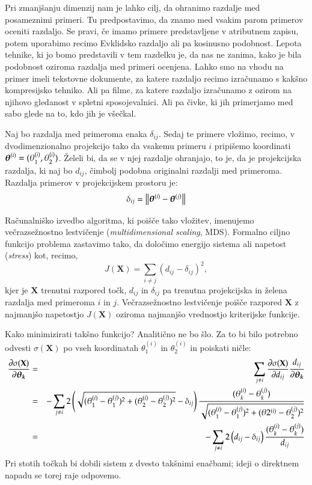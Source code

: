 Pri zmanjšanju dimenzij nam je lahko cilj, da ohranimo razdalje med posameznimi primeri. Tu predpostavimo, da znamo med vsakim parom primerov oceniti razdaljo. Se pravi, če imamo primere predstavljene v atributnem zapisu, potem uporabimo recimo Evklidsko razdaljo ali pa kosinusno podobnost. Lepota tehnike, ki jo bomo predstavili v tem razdelku je, da nas ne zanima, kako je bila podobnost oziroma razdalja med primeri ocenjena. Lahko smo na vhodu na primer imeli tekstovne dokumente, za katere razdaljo recimo izračunamo s kakšno kompresijsko tehniko. Ali pa filme, za katere razdaljo izračunamo z ozirom na njihovo gledanost v spletni sposojevalnici. Ali pa čivke, ki jih primerjamo med sabo glede na to, kdo jih je všečkal.

Naj bo razdalja med primeroma enaka $\delta_{ij}$. Sedaj te primere vložimo, recimo, v dvodimenzionalno projekcijo tako da vsakemu primeru $i$ pripišemo koordinati $\boldsymbol{\theta}^{(i)}=(\theta_1^{(i)},\theta_2^{(i)})$. Želeli bi, da se v njej razdalje ohranjajo, to je, da je projekcijska razdalja, ki naj bo $d_{ij}$, čimbolj podobna originalni razdalji med primeroma. Razdalja primerov v projekcijskem prostoru je:
$$\delta_{ij}=\left\lVert{\boldsymbol{\theta}}^{(i)}-\boldsymbol{\theta}^{(j)}\right\rVert$$

Računalniško izvedbo algoritma, ki poišče tako vložitev, imenujemo večrazsežnostno lestvičenje ({\em multidimensional scaling}, MDS). Formalno ciljno funkcijo problema zastavimo tako, da določimo energijo sistema ali napetost ({\em stress}) kot, recimo,
$$J(\mathbf{X}) = \sum_{i\ne j} (d_{ij} - \delta_{ij})^2,$$
kjer je $\mathbf{X}$ trenutni razpored točk, $d_{ij}$ in $\delta_{ij}$ pa trenutna projekcijska in želena razdalja med primeroma $i$ in $j$. Večrazsežnostno lestvičenje poišče razpored $\mathbf{X}$ z najmanjšo napetostjo $J(\mathbf{X})$ oziroma najmanjšo vrednostjo kriterijske funkcije.

Kako minimizirati takšno funkcijo? Analitično ne bo šlo. Za to bi bilo potrebno odvesti $\sigma(\mathbf{X})$ po vseh koordinatah $\theta_1^{(i)}$ in $\theta_2^{(i)}$ in poiskati ničle:
\begin{eqnarray}
  \frac{\partial\sigma({\mathbf{X}})}{\partial \boldsymbol{\theta_k}} & = &
  \sum_{j\ne i} \frac{\partial\sigma({\mathbf{X}})}{\partial d_{ij}}\frac{d_{ij}}{\partial \boldsymbol{\theta_k}} \nonumber \\
  & = & - \sum_{j\ne i} 2\left(\sqrt{(\theta_1^{(i)}-\theta_1^{(j)})^2+(\theta_2^{(i)}-\theta_2^{(j)})^2}-\delta_{ij}\right) \frac{(\theta_k^{(i)}-\theta_k^{(j)})}{\sqrt{(\theta_1^{(i)}-\theta_1^{(j)})^2+(\theta2^{(i)}-\theta_2^{(j)})^2}} \nonumber \\
& = & - \sum_{j\ne i} 2\left(d_{ij}-\delta_{ij}\right) \frac{(\theta_k^{(i)}-\theta_k^{(j)})}{d_{ij}} \label{eq:mds-grad}
\end{eqnarray}
Pri stotih točkah bi dobili sistem z dvesto takšnimi enačbami; ideji o direktnem napadu se torej raje odpovemo.

